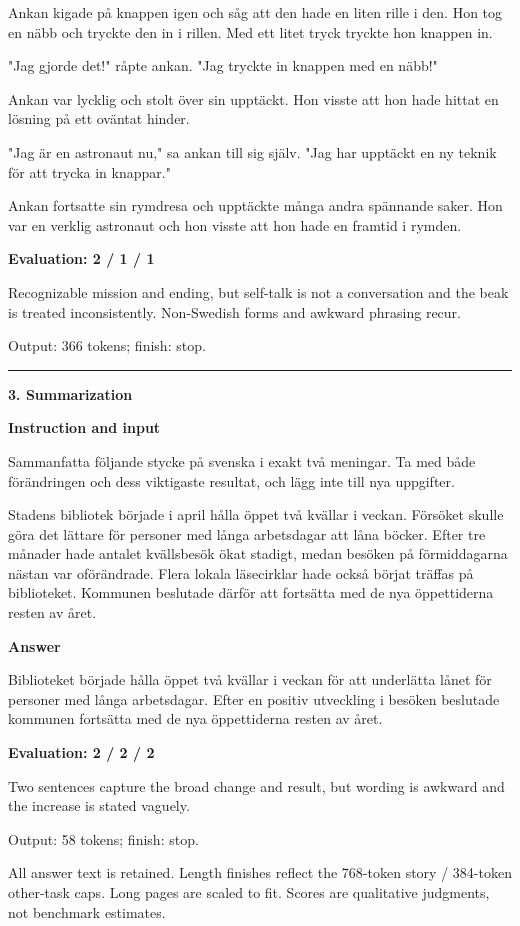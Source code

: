 \documentclass[10pt]{article}
\begin{document}
{\begin{minipage}{\textwidth}
\par\smallskip
Ankan kigade på knappen igen och såg att den hade en liten rille i den. Hon tog en näbb och tryckte den in i rillen. Med ett litet tryck tryckte hon knappen in.
\par\smallskip
"Jag gjorde det!" råpte ankan. "Jag tryckte in knappen med en näbb!"
\par\smallskip
Ankan var lycklig och stolt över sin upptäckt. Hon visste att hon hade hittat en lösning på ett oväntat hinder.
\par\smallskip
"Jag är en astronaut nu," sa ankan till sig själv. "Jag har upptäckt en ny teknik för att trycka in knappar."
\par\smallskip
Ankan fortsatte sin rymdresa och upptäckte många andra spännande saker. Hon var en verklig astronaut och hon visste att hon hade en framtid i rymden.\par\smallskip
\textbf{Evaluation: 2 / 1 / 1}\par Recognizable mission and ending, but self-talk is not a conversation and the beak is treated inconsistently. Non-Swedish forms and awkward phrasing recur.
\par {\color{gray} Output: 366 tokens; finish: stop.}\par
\medskip\hrule\smallskip
{\bfseries 3. Summarization}\par\smallskip
\textbf{Instruction and input}\par Sammanfatta följande stycke på svenska i exakt två meningar. Ta med både förändringen och dess viktigaste resultat, och lägg inte till nya uppgifter.
\par\smallskip
Stadens bibliotek började i april hålla öppet två kvällar i veckan. Försöket skulle göra det lättare för personer med långa arbetsdagar att låna böcker. Efter tre månader hade antalet kvällsbesök ökat stadigt, medan besöken på förmiddagarna nästan var oförändrade. Flera lokala läsecirklar hade också börjat träffas på biblioteket. Kommunen beslutade därför att fortsätta med de nya öppettiderna resten av året.\par\smallskip
\textbf{Answer}\par Biblioteket började hålla öppet två kvällar i veckan för att underlätta lånet för personer med långa arbetsdagar. Efter en positiv utveckling i besöken beslutade kommunen fortsätta med de nya öppettiderna resten av året.\par\smallskip
\textbf{Evaluation: 2 / 2 / 2}\par Two sentences capture the broad change and result, but wording is awkward and the increase is stated vaguely.
\par {\color{gray} Output: 58 tokens; finish: stop.}\par
\medskip\footnotesize All answer text is retained. Length finishes reflect the 768-token story / 384-token other-task caps. Long pages are scaled to fit. Scores are qualitative judgments, not benchmark estimates.
\end{minipage}}%
\end{document}

